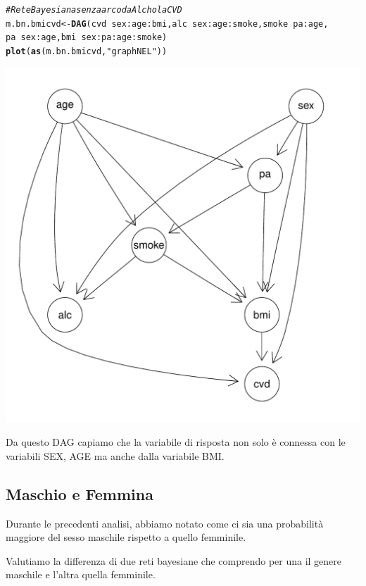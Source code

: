 \documentclass{article}\usepackage[]{graphicx}\usepackage[]{xcolor}
\makeatletter
\def\maxwidth{ %
  \ifdim\Gin@nat@width>\linewidth
    \linewidth
  \else
    \Gin@nat@width
  \fi
}
\newcommand{\hlstr}[1]{\textcolor[rgb]{0.192,0.494,0.8}{#1}}%
\newcommand{\hlcom}[1]{\textcolor[rgb]{0.678,0.584,0.686}{\textit{#1}}}%
\newcommand{\hlopt}[1]{\textcolor[rgb]{0,0,0}{#1}}%
\newcommand{\hlstd}[1]{\textcolor[rgb]{0.345,0.345,0.345}{#1}}%
\newcommand{\hlkwb}[1]{\textcolor[rgb]{0.69,0.353,0.396}{#1}}%
\newcommand{\hlkwd}[1]{\textcolor[rgb]{0.737,0.353,0.396}{\textbf{#1}}}%
\newenvironment{kframe}{%
 \def\at@end@of@kframe{}%
 \ifinner\ifhmode%
  \def\at@end@of@kframe{\end{minipage}}%
  \begin{minipage}{\columnwidth}%
 \fi\fi%
 \def\FrameCommand##1{\hskip\@totalleftmargin \hskip-\fboxsep
 \colorbox{shadecolor}{##1}\hskip-\fboxsep
     \hskip-\linewidth \hskip-\@totalleftmargin \hskip\columnwidth}%
 \MakeFramed {\advance\hsize-\width
   \@totalleftmargin\z@ \linewidth\hsize
   \@setminipage}}%
 {\par\unskip\endMakeFramed%
 \at@end@of@kframe}
\newenvironment{knitrout}{}{} %
\makeatother
\begin{document}
\begin{knitrout}
\color{fgcolor}\begin{kframe}
\begin{alltt}
\hlcom{#Rete Bayesiana senza arco da Alchol a CVD}
\hlstd{m.bn.bmicvd} \hlkwb{<-} \hlkwd{DAG}\hlstd{(cvd}\hlopt{~}\hlstd{sex}\hlopt{:}\hlstd{age}\hlopt{:}\hlstd{bmi, alc}\hlopt{~}\hlstd{sex}\hlopt{:}\hlstd{age}\hlopt{:}\hlstd{smoke, smoke}\hlopt{~}\hlstd{pa}\hlopt{:}\hlstd{age,}
                   \hlstd{pa}\hlopt{~}\hlstd{sex}\hlopt{:}\hlstd{age, bmi}\hlopt{~}\hlstd{sex}\hlopt{:}\hlstd{pa}\hlopt{:}\hlstd{age}\hlopt{:}\hlstd{smoke)}
\hlkwd{plot}\hlstd{(}\hlkwd{as}\hlstd{(m.bn.bmicvd,} \hlstr{"graphNEL"}\hlstd{))}
\end{alltt}
\end{kframe}
\includegraphics[width=\maxwidth]{figure/Rete_Bayesiana_senza_arco_tra_Alchol_e_CVD-1} 
\end{knitrout}
    
    Da questo DAG capiamo che la variabile di risposta non solo è connessa con
    le variabili SEX, AGE ma anche dalla variabile BMI.
    
  \subsection{Maschio e Femmina}
    Durante le precedenti analisi, abbiamo notato come ci sia una probabilità 
    maggiore del sesso maschile rispetto a quello femminile.\par
    Valutiamo la differenza di due reti bayesiane che comprendo per una il
    genere maschile e l'altra quella femminile.
    
\end{document}
